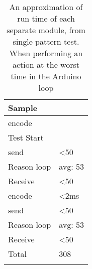 \begin{center}
	\begin{table}[htbp]
	  \centering
	  \begin{tabular}{l | l}
		\toprule
		Sample  		& 			\\ \midrule
		encode 			& 		  	\\
		Test Start		&			\\
		send   			& <50  		\\
		Reason loop 	& avg: 53 	\\
		Receive 		& <50  		\\
		encode 			& <2ms  	\\
		send   			& <50  		\\
		Reason loop 	& avg: 53 	\\
		Receive 		& <50  		\\
		Total			& 308		\\
									\\ \bottomrule
	  \end{tabular}
	  \caption{An approximation of run time of each separate module, from single pattern test. When performing an action at the worst time in the Arduino loop}
	\end{table}
 \label{Table:WorstRunTimeAprox}
\end{center}
